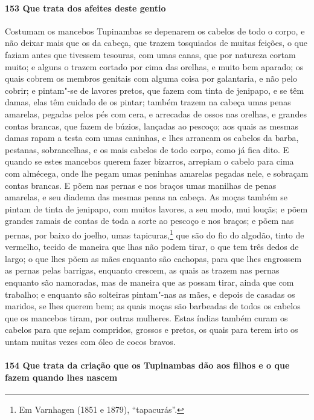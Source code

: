 \paragraph{153 Que trata dos afeites deste gentio}

Costumam os mancebos Tupinambas se depenarem os cabelos de todo o corpo, e não deixar
mais que os da cabeça, que trazem tosquiados de muitas feições, o que faziam antes que
tivessem tesouras, com umas canas, que por natureza cortam muito; e alguns o trazem
cortado por cima das orelhas, e muito bem aparado; os quais cobrem os membros genitais com
alguma coisa por galantaria, e não pelo cobrir; e pintam"-se de lavores pretos, que fazem
com tinta de jenipapo, e se têm damas, elas têm cuidado de os pintar; também trazem na
cabeça umas penas amarelas, pegadas pelos pés com cera, e arrecadas de ossos nas orelhas,
e grandes contas brancas, que fazem de búzios, lançadas ao pescoço; aos quais as mesmas
damas rapam a testa com umas caninhas, e lhes arrancam os cabelos da barba, pestanas,
sobrancelhas, e os mais cabelos de todo corpo, como já fica dito. E quando se estes
mancebos querem fazer bizarros, arrepiam o cabelo para cima com almécega, onde lhe pegam
umas peninhas amarelas pegadas nele, e sobraçam contas brancas. E põem nas pernas e nos
braços umas manilhas de penas amarelas, e seu diadema das mesmas penas na cabeça. As moças
também se pintam de tinta de jenipapo, com muitos lavores, a seu modo, mui louçãs; e põem
grandes ramais de contas de toda a sorte ao pescoço e nos braços; e põem nas pernas, por
baixo do joelho, umas tapicuras,\footnote{ Em Varnhagen (1851 e 1879), ``tapacurás''.} que
são do fio do algodão, tinto de vermelho, tecido de maneira que lhas não podem tirar, o
que tem três dedos de largo; o que lhes põem as mães enquanto são cachopas, para que lhes
engrossem as pernas pelas barrigas, enquanto crescem, as quais as trazem nas pernas
enquanto são namoradas, mas de maneira que as possam tirar, ainda que com trabalho; e
enquanto são solteiras pintam"-nas as mães, e depois de casadas os maridos, se lhes querem
bem; as quais moças são barbeadas de todos os cabelos que os mancebos tiram, por outras
mulheres. Estas índias também curam os cabelos para que sejam compridos, grossos e pretos,
os quais para terem isto os untam muitas vezes com óleo de cocos bravos.

\paragraph{154 Que trata da criação que os Tupinambas dão aos filhos e o que fazem quando
lhes nascem}

